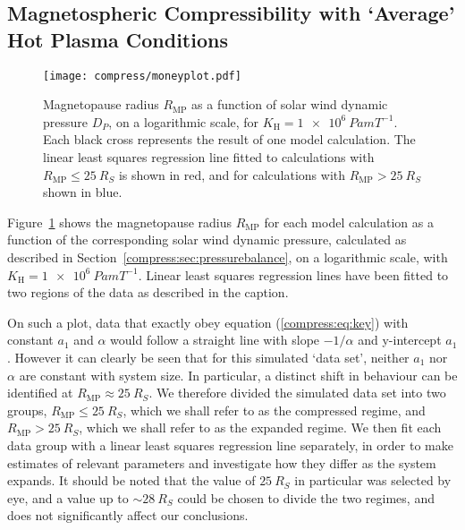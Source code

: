 \subsection{Magnetospheric Compressibility with `Average' Hot Plasma Conditions}
\begin{figure}
\centering
\noindent\texttt{[image: compress/moneyplot.pdf]}
\caption[Magnetopause radius versus solar wind dynamic pressure compressibility profile for `typical' hot plasma content $K_\mathrm{H}$.]{Magnetopause radius $R_\mathrm{MP}$ as a function of solar wind dynamic pressure $D_{P}$, on a logarithmic scale, for $K_\mathrm{H}=\SI{1e6}{Pa m T^{-1}}$. Each black cross represents the result of one model calculation. The linear least squares regression line fitted to calculations with $R_\mathrm{MP} \leq \SI{25}{R_S}$ is shown in red, and for calculations with $R_\mathrm{MP} > \SI{25}{R_S}$ shown in blue.}
\label{compress:fig:money1}
\end{figure}
Figure~\ref{compress:fig:money1} shows the magnetopause radius $R_\mathrm{MP}$ for each model calculation as a function of the corresponding solar wind dynamic pressure, calculated as described in Section~\ref{compress:sec:pressurebalance}, on a logarithmic scale, with $K_\mathrm{H}=\SI{1e6}{Pa m T^{-1}}$. Linear least squares regression lines have been fitted to two regions of the data as described in the caption.

On such a plot, data that exactly obey equation (\ref{compress:eq:key}) with constant $a_1$ and $\alpha$ would follow a straight line with slope $-1/\alpha$ and y-intercept $a_1$. However it can clearly be seen that for this simulated `data set', neither $a_1$ nor $\alpha$ are constant with system size.
In particular, a distinct shift in behaviour can be identified at $R_\mathrm{MP} \approx \SI{25}{R_S}$. We therefore divided the simulated data set into two groups, $R_\mathrm{MP} \leq \SI{25}{R_S}$, which we shall refer to as the compressed regime, and $R_\mathrm{MP} > \SI{25}{R_S}$, which we shall refer to as the expanded regime. We then fit each data group with a linear least squares regression line separately, in order to make estimates of relevant parameters and investigate how they differ as the system expands. It should be noted that the value of $\SI{25}{R_S}$ in particular was selected by eye, and a value up to ${\sim}\SI{28}{R_S}$ could be chosen to divide the two regimes, and does not significantly affect our conclusions.

